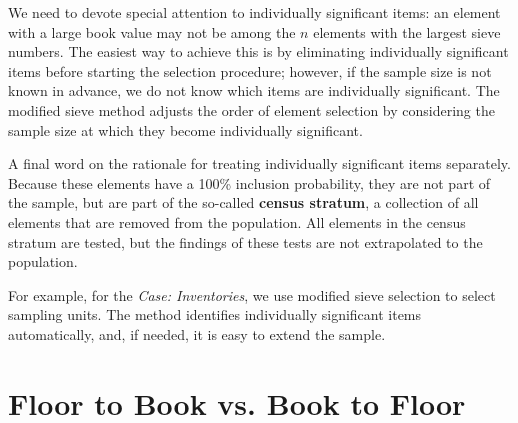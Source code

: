 \documentclass[12pt,a4paper]{memoir}
\begin{document}
We need to devote special attention to individually significant items: an element with a large book value may not be among the $n$ elements with the largest sieve numbers. The easiest way to achieve this is by eliminating individually significant items before starting the selection procedure; however, if the sample size is not known in advance, we do not know which items are individually significant. The modified sieve method adjusts the order of element selection by considering the sample size at which they become individually significant.

\newpage
A final word on the rationale for treating individually significant items separately. Because these elements have a 100\% inclusion pro\-ba\-bi\-lity, they are not part of the sample, but are part of the so-called \textbf{census stratum}, a collection of all elements that are removed from the population. All elements in the census stratum are tested, but the findings of these tests are not extrapolated to the population.

For example, for the \emph{Case: Inventories}, we use modified sieve selection to select sampling units. The method identifies individually significant items automatically, and, if needed, it is easy to extend the sample.


\chapter{Floor to Book vs. Book to Floor}
\end{document}
